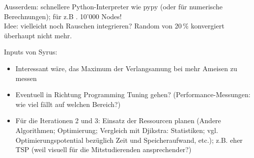 Ausserdem: schnellere Python-Interpreter wie pypy (oder für numerische Berechnungen); für z.B . 10'000 Nodes! \\

Idee: vielleicht noch Rauschen integrieren? Random von 20\,\% konvergiert überhaupt nicht mehr.

\vspace*{3cm}


Inputs von Syrus: \\

\begin{itemize}
\item Interessant wäre, das Maximum der Verlangsamung bei mehr Ameisen zu messen
\item Eventuell in Richtung Programming Tuning gehen? (Performance-Messungen: wie viel fällt auf welchen Bereich?) 
\item Für die Iterationen 2 und 3: Einsatz der Ressourcen planen (Andere Algorithmen; Optimierung; Vergleich mit Djikstra: Statistiken; vgl. Optimierungspotential bezüglich Zeit und Speicheraufwand, etc.); z.B. eher TSP (weil visuell für die Mitstudierenden ansprechender?) 
\end{itemize}